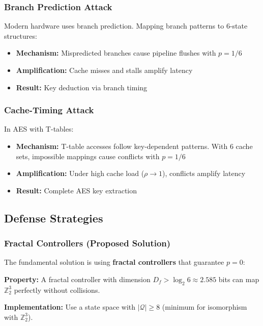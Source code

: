 \documentclass[11pt]{article}
\begin{document}
\subsubsection{Branch Prediction Attack}

Modern hardware uses branch prediction. Mapping branch patterns to 6-state structures:
\begin{itemize}
    \item \textbf{Mechanism:} Mispredicted branches cause pipeline flushes with $p = 1/6$
    \item \textbf{Amplification:} Cache misses and stalls amplify latency
    \item \textbf{Result:} Key deduction via branch timing
\end{itemize}

\subsubsection{Cache-Timing Attack}

In AES with T-tables:
\begin{itemize}
    \item \textbf{Mechanism:} T-table accesses follow key-dependent patterns. With 6 cache sets, impossible mappings cause conflicts with $p = 1/6$
    \item \textbf{Amplification:} Under high cache load ($\rho \to 1$), conflicts amplify latency
    \item \textbf{Result:} Complete AES key extraction
\end{itemize}

\subsection{Defense Strategies}

\subsubsection{Fractal Controllers (Proposed Solution)}

The fundamental solution is using \textbf{fractal controllers} that guarantee $p = 0$:

\textbf{Property:} A fractal controller with dimension $D_f > \log_2 6 \approx 2.585$ bits can map $\mathbb{Z}_2^3$ perfectly without collisions.

\textbf{Implementation:} Use a state space with $|\mathcal{Q}| \geq 8$ (minimum for isomorphism with $\mathbb{Z}_2^3$).
\end{document}
